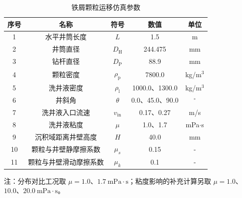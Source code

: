 \begin{table}[htbp]
    \centering
    \caption{铁屑颗粒运移仿真参数}
    \label{tab:simulation_params}
    \begin{tabularx}{.9\textwidth}{CCCCC} 
        \toprule %
        序号 & 名称 & 符号 & 数值 & 单位 \\ 
        \midrule %

        
        1 & 水平井筒长度 & $L$ & 1.5 & m \\
        2 & 井筒直径 & $D_\mathrm{H}$ & 244.475 & mm \\
        3 & 钻杆直径 & $D_\mathrm{P}$ & 88.9 & mm \\
        4 & 颗粒密度 & $\rho_\mathrm{p}$ & 7800.0 & kg/m$^3$ \\
        5 & 洗井液密度 & $\rho_\mathrm{l}$ & 1000.0、1300.0 & kg/m$^3$ \\
        6 & 井斜角 & $\theta$ & 0.0、45.0、90.0 & $^\circ$ \\
        7 & 洗井液入口流速 & $v_{\mathrm{in}}$ & 0.17、0.27 & m/s \\
        8 & 洗井液粘度 & $\mu$ & 1.0、1.7 & mPa$\cdot$s \\
        9 & 沉积域距离井壁高度 & $H$ & 40.0 & mm \\
        10 & 颗粒与井壁静摩擦系数 & $\mu_s$ & 0.15 & - \\
        11 & 颗粒与井壁滑动摩擦系数 & $\mu_k$ & 0.1 & - \\
        
        \bottomrule %
    \end{tabularx}
    \par\vspace{4pt}
    {\small 注：分布对比工况取 $\mu=1.0$、$1.7\ \mathrm{mPa\cdot s}$；粘度影响的补充计算另取 $\mu=1.0$、$10.0$、$20.0\ \mathrm{mPa\cdot s}$。}
\end{table}

